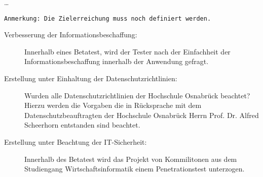 	\ldots
	
	\texttt{Anmerkung: Die Zielerreichung muss noch definiert werden.}
	
	\clearpage
	
	\begin{description}
	\item[Verbesserung der Informationsbeschaffung:] Innerhalb eines Betatest, wird
	der Tester nach der Einfachheit der Informationsbeschaffung innerhalb der
	Anwendung gefragt.
	\item[Erstellung unter Einhaltung der Datenschutzrichtlinien:] Wurden alle
	Datenschutzrichtlinien  der Hochschule Osnabrück beachtet? Hierzu werden die
	Vorgaben die in Rücksprache  mit dem Datenschutzbeauftragten der Hochschule
	Osnabrück  Herrn Prof. Dr. Alfred Scheerhorn entstanden sind beachtet.
	\item[Erstellung unter Beachtung der IT-Sicherheit:] Innerhalb des Betatest
	wird das Projekt von Kommilitonen aus dem Studiengang Wirtschaftsinformatik
	einem Penetrationstest unterzogen.
\end{description}